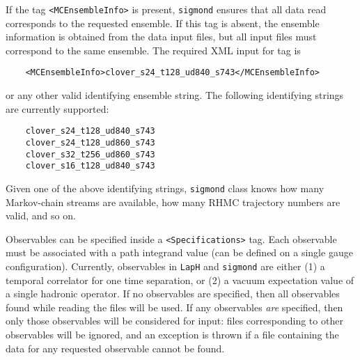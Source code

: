 \documentclass[12pt,notitlepage,letterpaper]{article}
\newcommand{\vb}{\texttt}
\begin{document}
If the tag \vb{<MCEnsembleInfo>} is present, \vb{sigmond} ensures that 
all data read corresponds to the requested ensemble.  If this tag is absent,
the ensemble information is obtained from the data input files, but all 
input files must correspond to the same ensemble. The required XML input for
tag is
\begin{verbatim}
    <MCEnsembleInfo>clover_s24_t128_ud840_s743</MCEnsembleInfo>
\end{verbatim}
or any other valid identifying ensemble string.
The following identifying strings are currently supported:
\begin{verbatim}
    clover_s24_t128_ud840_s743
    clover_s24_t128_ud860_s743
    clover_s32_t256_ud860_s743
    clover_s16_t128_ud840_s743
\end{verbatim}
Given one of the above identifying strings, \vb{sigmond} class knows how many 
Markov-chain streams are available, how many RHMC trajectory numbers are 
valid, and so on.

Observables can be specified inside a \vb{<Specifications>} tag.  Each observable
must be associated with a path integrand value (can be defined on a single gauge
configuration).  Currently, observables in \vb{LapH} and \vb{sigmond} are either
(1) a temporal correlator for one time separation, or (2) a vacuum expectation 
value of a single hadronic operator.
If no observables are specified, then all observables found while reading the 
files will be used.  If any observables \textit{are} specified, then only 
those observables will be considered for input: files corresponding to other 
observables will be ignored, and an exception is thrown if a file containing
the data for any requested observable cannot be found. 
\end{document}
